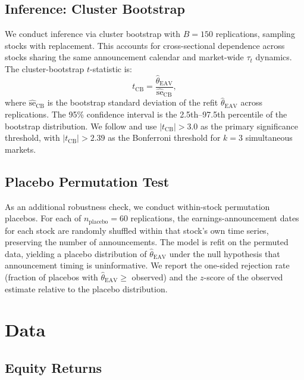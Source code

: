 \documentclass[12pt,a4paper]{article}
\begin{document}
\subsection{Inference: Cluster Bootstrap}

We conduct inference via cluster bootstrap with $B = 150$ replications, sampling
stocks with replacement. This accounts for cross-sectional dependence across
stocks sharing the same announcement calendar and market-wide $\tau_t$ dynamics.
The cluster-bootstrap $t$-statistic is:
%
\begin{equation}
t_{\mathrm{CB}} = \frac{\hat{\theta}_{\mathrm{EAV}}}{\widehat{\mathrm{se}}_{\mathrm{CB}}},
\label{eq:t_cb}
\end{equation}
%
where $\widehat{\mathrm{se}}_{\mathrm{CB}}$ is the bootstrap standard deviation
of the refit $\hat{\theta}_{\mathrm{EAV}}$ across replications. The 95\%
confidence interval is the 2.5th--97.5th percentile of the bootstrap distribution.
We follow \citet{harvey2016} and use $|t_{\mathrm{CB}}| > 3.0$ as the primary
significance threshold, with $|t_{\mathrm{CB}}| > 2.39$ as the Bonferroni
threshold for $k = 3$ simultaneous markets.

\subsection{Placebo Permutation Test}

As an additional robustness check, we conduct within-stock permutation placebos.
For each of $n_{\mathrm{placebo}} = 60$ replications, the earnings-announcement
dates for each stock are randomly shuffled within that stock's own time series,
preserving the number of announcements. The model is refit on the permuted data,
yielding a placebo distribution of $\hat{\theta}_{\mathrm{EAV}}$ under the null
hypothesis that announcement timing is uninformative. We report the one-sided
rejection rate (fraction of placebos with $\hat{\theta}_{\mathrm{EAV}} \geq$
observed) and the $z$-score of the observed estimate relative to the placebo
distribution.

\section{Data}
\label{sec:data}

\subsection{Equity Returns}
\end{document}
